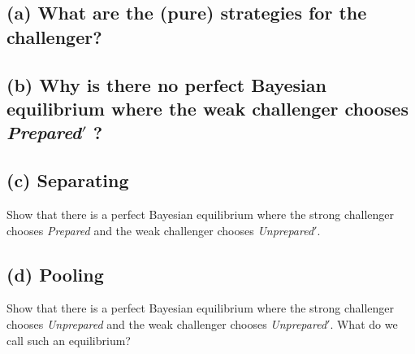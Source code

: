 \documentclass{article}
\begin{document}
\medskip

\subsection{(a) What are the (pure) strategies for the challenger?} 



\subsection{(b) Why is there no perfect Bayesian equilibrium where the weak challenger chooses
\textit{Prepared}$'$ ? }


\subsection{(c) Separating}Show that there is a perfect Bayesian equilibrium where the strong challenger chooses
\textit{Prepared} and the weak challenger chooses \textit{Unprepared}$'$. 


\subsection{(d) Pooling}Show that there is a perfect Bayesian equilibrium where the strong challenger chooses
\textit{Unprepared} and the weak challenger chooses \textit{Unprepared}$'$. What do we call such an
equilibrium? 
\end{document}
